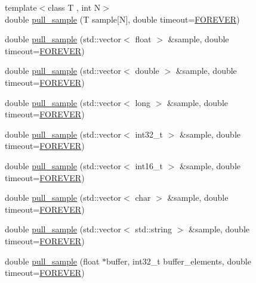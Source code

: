 \begin{DoxyCompactItemize}
\item 
{\footnotesize template$<$class T , int N$>$ }\\double \hyperlink{classlsl_1_1stream__inlet_a58dc91be6ec0d1b83024a169ad0c292b}{pull\+\_\+sample} (T sample\mbox{[}N\mbox{]}, double timeout=\hyperlink{namespacelsl_a74cfbc9077aca21295117217249721ed}{F\+O\+R\+E\+V\+ER})
\item 
double \hyperlink{classlsl_1_1stream__inlet_af3707fbfd5e9f54be73f9d55de55a8fc}{pull\+\_\+sample} (std\+::vector$<$ float $>$ \&sample, double timeout=\hyperlink{namespacelsl_a74cfbc9077aca21295117217249721ed}{F\+O\+R\+E\+V\+ER})
\item 
double \hyperlink{classlsl_1_1stream__inlet_a447dd270fa83d8f1df16963b8601027e}{pull\+\_\+sample} (std\+::vector$<$ double $>$ \&sample, double timeout=\hyperlink{namespacelsl_a74cfbc9077aca21295117217249721ed}{F\+O\+R\+E\+V\+ER})
\item 
double \hyperlink{classlsl_1_1stream__inlet_a80fecf88ba609c7e4898eb16a49f2b75}{pull\+\_\+sample} (std\+::vector$<$ long $>$ \&sample, double timeout=\hyperlink{namespacelsl_a74cfbc9077aca21295117217249721ed}{F\+O\+R\+E\+V\+ER})
\item 
double \hyperlink{classlsl_1_1stream__inlet_af33558ccbbe57767386278d2255db1a1}{pull\+\_\+sample} (std\+::vector$<$ int32\+\_\+t $>$ \&sample, double timeout=\hyperlink{namespacelsl_a74cfbc9077aca21295117217249721ed}{F\+O\+R\+E\+V\+ER})
\item 
double \hyperlink{classlsl_1_1stream__inlet_a7789d75e1afceaf5187e8bc33a0b99be}{pull\+\_\+sample} (std\+::vector$<$ int16\+\_\+t $>$ \&sample, double timeout=\hyperlink{namespacelsl_a74cfbc9077aca21295117217249721ed}{F\+O\+R\+E\+V\+ER})
\item 
double \hyperlink{classlsl_1_1stream__inlet_a3a2a662e0b723d7f2101b79eb08371b7}{pull\+\_\+sample} (std\+::vector$<$ char $>$ \&sample, double timeout=\hyperlink{namespacelsl_a74cfbc9077aca21295117217249721ed}{F\+O\+R\+E\+V\+ER})
\item 
double \hyperlink{classlsl_1_1stream__inlet_a78a36bf33ddfc7101bd15cb5bcb9561d}{pull\+\_\+sample} (std\+::vector$<$ std\+::string $>$ \&sample, double timeout=\hyperlink{namespacelsl_a74cfbc9077aca21295117217249721ed}{F\+O\+R\+E\+V\+ER})
\item 
double \hyperlink{classlsl_1_1stream__inlet_a4a10bd640a10c317ba4a0244cc986146}{pull\+\_\+sample} (float $\ast$buffer, int32\+\_\+t buffer\+\_\+elements, double timeout=\hyperlink{namespacelsl_a74cfbc9077aca21295117217249721ed}{F\+O\+R\+E\+V\+ER})

\end{DoxyCompactItemize}

